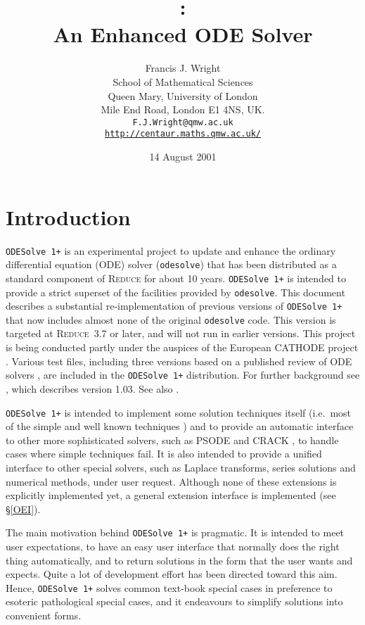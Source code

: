 \documentclass[a4paper]{article} %
\title{\ODESolve{1.065} : \\ An Enhanced \REDUCE{} ODE Solver}
\author{Francis J. Wright \\
School of Mathematical Sciences \\
Queen Mary, University of London \\
Mile End Road, London E1 4NS, UK. \\
\texttt{F.J.Wright@qmw.ac.uk} \\
\href{http://centaur.maths.qmw.ac.uk/}
{\texttt{http://centaur.maths.qmw.ac.uk/}}}
\date{14 August 2001}
\newcommand{\ODESolve}[1]{\texttt{ODESolve\,#1}}
\newcommand{\odesolve}{\texttt{odesolve}}
\newcommand{\REDUCE}{\textsc{Reduce}}
\begin{document}
\maketitle

\tableofcontents

\section{Introduction}

\ODESolve{1+} is an experimental project to update and enhance the
ordinary differential equation (ODE) solver (\odesolve{}) that has
been distributed as a standard component of \REDUCE{}
\cite{Hearn-manual,MacCallum-doc,MacCallum-ISSAC} for about 10 years.
\ODESolve{1+} is intended to provide a strict superset of the
facilities provided by \odesolve{}.  This document describes a
substantial re-implementation of previous versions of \ODESolve{1+}
that now includes almost none of the original \odesolve{} code.  This
version is targeted at \REDUCE~3.7 or later, and will not run in
earlier versions.  This project is being conducted partly under the
auspices of the European CATHODE project \cite{CATHODE}.  Various test
files, including three versions based on a published review of ODE
solvers \cite{Zimmermann}, are included in the \ODESolve{1+}
distribution.  For further background see \cite{FJW1}, which describes
version 1.03.  See also \cite{FJW2}.

\ODESolve{1+} is intended to implement some solution techniques itself
(i.e.\ most of the simple and well known techniques \cite{Zwillinger})
and to provide an automatic interface to other more sophisticated
solvers, such as PSODE \cite{Man,Man-MacCallum,Prelle-Singer} and
CRACK \cite{CRACK-doc}, to handle cases where simple techniques fail.
It is also intended to provide a unified interface to other special
solvers, such as Laplace transforms, series solutions and numerical
methods, under user request.  Although none of these extensions is
explicitly implemented yet, a general extension interface is
implemented (see \S\ref{OEI}).

The main motivation behind \ODESolve{1+} is pragmatic.  It is intended
to meet user expectations, to have an easy user interface that
normally does the right thing automatically, and to return solutions
in the form that the user wants and expects.  Quite a lot of
development effort has been directed toward this aim.  Hence,
\ODESolve{1+} solves common text-book special cases in preference to
esoteric pathological special cases, and it endeavours to simplify
solutions into convenient forms.
\end{document}
